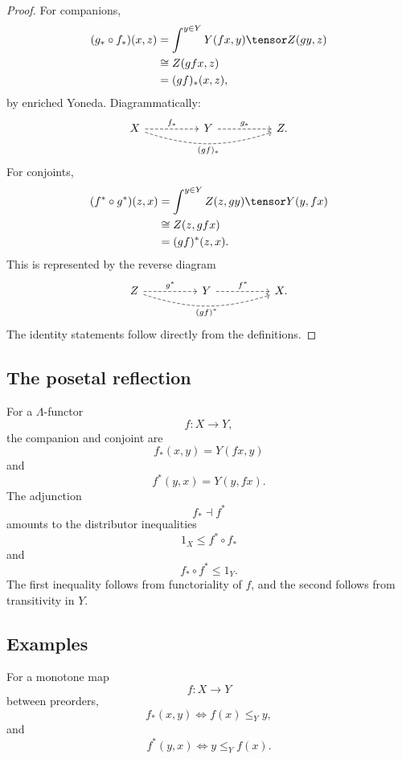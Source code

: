 \begin{proof}
For companions,
\[
\begin{aligned}
    (g_\ast\circ f_\ast)(x,z)
    &=
    \int^{y\in Y}
        Y(fx,y)\tensor Z(gy,z)
\\
    &\cong
    Z(gfx,z)
\\
    &=
    (gf)_\ast(x,z),
\end{aligned}
\]
by enriched Yoneda. Diagrammatically:
\[
\begin{tikzcd}[column sep=huge,row sep=large]
X
    \ar[r,dashed,"f_\ast"]
    \ar[rr,bend right=18,dashed,"{(gf)_\ast}"']
&
Y
    \ar[r,dashed,"g_\ast"]
&
Z.
\end{tikzcd}
\]
For conjoints,
\[
\begin{aligned}
    (f^\ast\circ g^\ast)(z,x)
    &=
    \int^{y\in Y}
        Z(z,gy)\tensor Y(y,fx)
\\
    &\cong
    Z(z,gfx)
\\
    &=
    (gf)^\ast(z,x).
\end{aligned}
\]
This is represented by the reverse diagram
\[
\begin{tikzcd}[column sep=huge,row sep=large]
Z
    \ar[r,dashed,"g^\ast"]
    \ar[rr,bend right=18,dashed,"{(gf)^\ast}"']
&
Y
    \ar[r,dashed,"f^\ast"]
&
X.
\end{tikzcd}
\]
The identity statements follow directly from the definitions.
\end{proof}

\subsection{The posetal reflection}
\label{subsec:companions-conjoints-posetal}

For a \(\Lambda\)-functor
\[
    f:X\to Y,
\]
the companion and conjoint are
\[
    f_\ast(x,y)=Y(fx,y)
\]
and
\[
    f^\ast(y,x)=Y(y,fx).
\]
The adjunction
\[
    f_\ast\dashv f^\ast
\]
amounts to the distributor inequalities
\[
    1_X\leq f^\ast\circ f_\ast
\]
and
\[
    f_\ast\circ f^\ast\leq 1_Y.
\]
The first inequality follows from functoriality of \(f\), and the second follows
from transitivity in \(Y\).

\subsection{Examples}
\label{subsec:companions-conjoints-examples}

\begin{example}
\label{ex:companions-crisp}
For a monotone map
\[
    f:X\to Y
\]
between preorders,
\[
    f_\ast(x,y)
    \Longleftrightarrow
    f(x)\leq_Y y,
\]
and
\[
    f^\ast(y,x)
    \Longleftrightarrow
    y\leq_Y f(x).
\]
\end{example}


